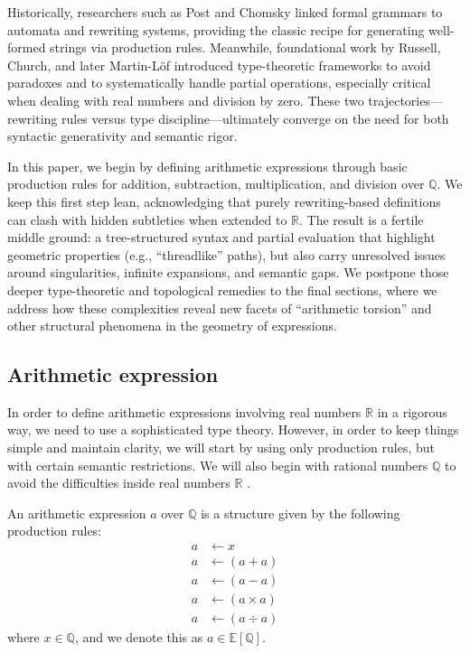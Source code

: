 Historically, researchers such as Post\cite{Post1943FormalRO} and Chomsky\cite{Chomsky1956ThreeMF} linked formal grammars to automata and rewriting systems, providing the classic recipe for generating well-formed strings via production rules. Meanwhile, foundational work by Russell\cite{Russell1908MathematicalLA}, Church\cite{Church1940AFO}\cite{Church1941TheCO}, and later Martin-Löf\cite{MartinLf1975AnIT}\cite{MartinLf1984IntuitionisticTT} introduced type-theoretic frameworks to avoid paradoxes and to systematically handle partial operations, especially critical when dealing with real numbers and division by zero. These two trajectories—rewriting rules versus type discipline—ultimately converge on the need for both syntactic generativity and semantic rigor\cite{Howard1969TheFN}\cite{Oosten2014TheUF}.

In this paper, we begin by defining arithmetic expressions through basic production rules for addition, subtraction, multiplication, and division over $\mathbb{Q}$. We keep this first step lean, acknowledging that purely rewriting-based definitions can clash with hidden subtleties when extended to $\mathbb{R}$. The result is a fertile middle ground: a tree-structured syntax and partial evaluation that highlight geometric properties (e.g., “threadlike” paths), but also carry unresolved issues around singularities, infinite expansions, and semantic gaps. We postpone those deeper type-theoretic and topological remedies to the final sections, where we address how these complexities reveal new facets of “arithmetic torsion” and other structural phenomena in the geometry of expressions.

\subsection{Arithmetic expression}\label{subsec:arithmetic-expression}

In order to define arithmetic expressions involving real numbers  $\mathbb{R}$ in a rigorous way, we need to use a sophisticated type theory.
However, in order to keep things simple and maintain clarity, we will start by using only production rules, but with certain semantic restrictions.
We will also begin with rational numbers $\mathbb{Q}$ to avoid the difficulties inside real numbers $\mathbb{R}$ .

\begin{definition}\label{def:arithmetic-expression}
    An arithmetic expression $a$ over $\mathbb{Q}$ is a structure given by the following production rules:
\begin{equation}\label{eq:productionrule}
\begin{aligned}
a &\longleftarrow x\\
a &\longleftarrow ( a + a )\\
a &\longleftarrow ( a - a )\\
a &\longleftarrow ( a \times a )\\
a &\longleftarrow ( a \div a )
\end{aligned}
\end{equation}
    where $x \in \mathbb{Q}$, and we denote this as $a \in \mathbb{E} \left [\mathbb{Q} \right ]$.
\end{definition}

